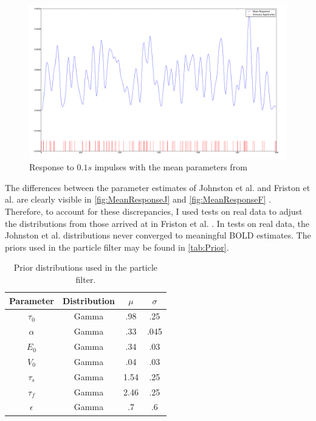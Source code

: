 \begin{figure}
\centering
\includegraphics[trim=6cm 2cm 6cm 2cm,width=15cm]{images/mean_response_johnston}
\caption{Response to $0.1s$ impulses with the mean parameters from \cite{Johnston2008}}
\label{fig:MeanResponseJ}
\end{figure}

The differences between the parameter estimates of Johnston et al. and
Friston et al. are clearly visible in \autoref{fig:MeanResponseJ} and
\autoref{fig:MeanResponseF} \cite{Johnston2008,Friston2002}.
Therefore, to account for these discrepancies, I used tests on
real data to adjust the distributions from those arrived at in
Friston et al. \cite{Friston2002}. In tests on real data, the Johnston et al.
distributions never converged to meaningful BOLD estimates.
The priors used in the particle filter may be found in \autoref{tab:Prior}.

\begin{table}[t]
\centering
\begin{tabular}{|c || c | c | c |}
\hline
Parameter & Distribution & $\mu$ & $\sigma$ \\
\hline
$\tau_0$ & Gamma & .98 & .25 \\
$\alpha$ & Gamma & .33 & .045\\
$E_0$    & Gamma & .34 & .03  \\
$V_0$    & Gamma & .04 & .03 \\
$\tau_s$ & Gamma & 1.54  & .25\\
$\tau_f$ & Gamma & 2.46  & .25\\
$\epsilon$ & Gamma & .7  & .6 \\
\hline
\end{tabular}
\caption{Prior distributions used in the particle filter.}
\label{tab:Prior}
\end{table}

